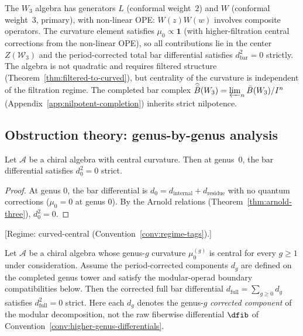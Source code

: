 \begin{example}\label{ex:w3-strict}
The $W_3$ algebra has generators $L$ (conformal weight~$2$) and $W$
(conformal weight~$3$, primary), with non-linear OPE: $W(z)W(w)$
involves composite operators. The curvature element satisfies
$\mu_0 \propto \mathbf{1}$ (with higher-filtration central corrections
from the non-linear OPE), so all contributions lie in the center
$Z(\mathcal{W}_3)$ and the period-corrected total bar differential
satisfies $d_{\text{bar}}^2 = 0$ strictly. The algebra
is not quadratic and requires filtered structure
(Theorem~\ref{thm:filtered-to-curved}), but centrality of the
curvature is independent of the filtration regime. The completed
bar complex $\widehat{\bar{B}}(W_3) = \varprojlim_n \bar{B}(W_3)/I^n$
(Appendix~\ref{app:nilpotent-completion}) inherits strict nilpotence.
\end{example}

\subsection{Obstruction theory: genus-by-genus analysis}

\begin{theorem}\label{thm:genus-zero-strict}
Let $\mathcal{A}$ be a chiral algebra with central curvature. Then at genus~$0$,
the bar differential satisfies $d_0^2 = 0$ strict.
\end{theorem}

\begin{proof}
At genus 0, the bar differential is
$d_0 = d_{\text{internal}} + d_{\text{residue}}$
with no quantum corrections ($\mu_0 = 0$ at genus 0).
By the Arnold relations (Theorem~\ref{thm:arnold-three}), $d_0^2 = 0$.
\end{proof}

\begin{theorem}\label{thm:genus-induction-strict}
\label{ex:mc-periods}
\textup{[Regime: curved-central\linebreak
\textup{(}Convention~\textup{\ref{conv:regime-tags})}.]}

Let $\mathcal{A}$ be a chiral algebra whose genus-$g$ curvature
$\mu_0^{(g)}$ is central for every $g \geq 1$ under consideration.
Assume the period-corrected components $d_g$ are defined on the
completed genus tower and satisfy the modular-operad boundary
compatibilities below. Then the corrected full bar differential
$d_{\mathrm{full}} = \sum_{g \geq 0} d_g$ satisfies
$d_{\mathrm{full}}^2 = 0$ strict.
Here each $d_g$ denotes the genus-$g$ \emph{corrected component} of
the modular decomposition, not the raw fiberwise differential
$\dfib$ of Convention~\textup{\ref{conv:higher-genus-differentials}}.
\end{theorem}

